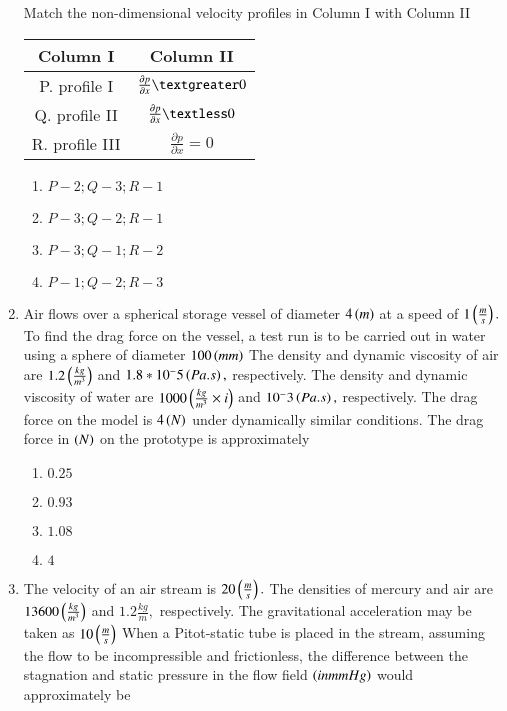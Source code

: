 \documentclass[journal,15pt,onecolumn]{IEEEtran}
\theoremstyle{remark}
\begin{document}
\begin{enumerate}[start=6]
Match the non-dimensional velocity profiles in Column I with Column II
\begin{table}[h]
    \centering
    \begin{tabular}{|c|c|} %
        \hline
        \textbf{Column I} & \textbf{Column II} \\ %
        \hline
        P. profile I & $\frac{\partial p}{\partial x}\textgreater 0$\\
        \hline
        Q. profile II & $\frac{\partial p}{\partial x}\textless 0$\\
        \hline
        R. profile III & $\frac{\partial p}{\partial x}= 0$\\
        \hline
        
    \end{tabular}
\end{table}
\begin{enumerate}
    \item $P-2;Q-3;R-1$
    \item $P-3;Q-2;R-1$
    \item $P-3;Q-1;R-2$
    \item $P-1;Q-2;R-3$
\end{enumerate}
\item Air flows over a spherical storage vessel of diameter $4 \left(m\right)$ at a speed of $1 \left(\frac{m}{s}\right).$ To find the drag force on the vessel, a test run is to be carried out in water using a sphere of diameter $100 \left(mm\right)$ The density and dynamic viscosity of air are $1.2\left(\frac{kg}{ m ^ 3}\right)$ and $1.8 * 10 ^ - 5 \left(Pa.s\right),$ respectively. The density and dynamic viscosity of water are $1000\left(\frac{kg}{m^3}\times i\right)$ and $10 ^ - 3 \left(Pa.s\right),$ respectively. The drag force on the model is $4 \left(N\right)$ under dynamically similar conditions. The drag force in $\left(N\right)$ on the prototype is approximately
\begin{enumerate}
    \item $0.25$
    \item $0.93$
    \item $1.08$
    \item $4$
\end{enumerate}
\item The velocity of an air stream is $20 \left(\frac{m}{s}\right).$ The densities of mercury and air are $13600 \left(\frac{kg}{m^3}\right)$ and $1.2\frac{kg}{m},$ respectively. The gravitational acceleration may be taken as $10 \left(\frac{m}{s}\right)$ When a Pitot-static tube is placed in the stream, assuming the flow to be incompressible and frictionless, the difference between the stagnation and static pressure in the flow field $\left(in mm Hg\right)$ would approximately be

\end{enumerate}
\end{document}

